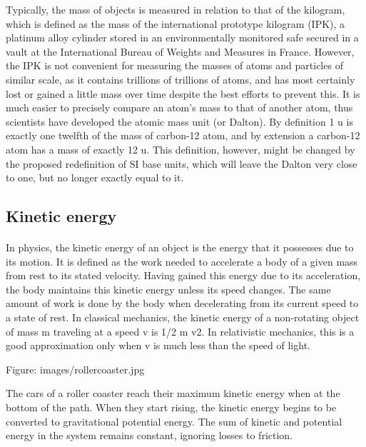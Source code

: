 \documentclass{book}
\begin{document}
Typically, the mass of objects is measured in relation to that of the kilogram, which is defined as the mass of the international prototype kilogram (IPK), a platinum alloy cylinder stored in an environmentally monitored safe secured in a vault at the International Bureau of Weights and Measures in France. However, the IPK is not convenient for measuring the masses of atoms and particles of similar scale, as it contains trillions of trillions of atoms, and has most certainly lost or gained a little mass over time despite the best efforts to prevent this. It is much easier to precisely compare an atom's mass to that of another atom, thus scientists have developed the atomic mass unit (or Dalton). By definition 1 u is exactly one twelfth of the mass of carbon-12 atom, and by extension a carbon-12 atom has a mass of exactly 12 u. This definition, however, might be changed by the proposed redefinition of SI base units, which will leave the Dalton very close to one, but no longer exactly equal to it.
\begin{landscape}
	\section{Kinetic energy}
	\paragraph{}
	In physics, the kinetic energy of an object is the energy that it possesses due to its motion. It is defined as the work needed to accelerate a body of a given mass from rest to its stated velocity. Having gained this energy due to its acceleration, the body maintains this kinetic energy unless its speed changes. The same amount of work is done by the body when decelerating from its current speed to a state of rest. In classical mechanics, the kinetic energy of a non-rotating object of mass m traveling at a speed v is 1/2 m v2. In relativistic mechanics, this is a good approximation only when v is much less than the speed of light.
	
	Figure: images/rollercoaster.jpg
	
	The cars of a roller coaster reach their maximum kinetic energy when at the bottom of the path. When they start rising, the kinetic energy begins to be converted to gravitational potential energy. The sum of kinetic and potential energy in the system remains constant, ignoring losses to friction.
\end{landscape}
	
\end{document}
